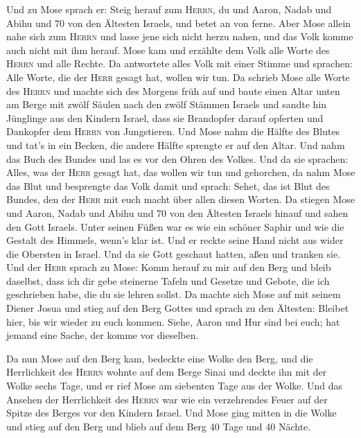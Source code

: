  Und zu Mose sprach er: Steig herauf zum \textsc{Herrn},
du und Aaron, Nadab und Abihu und 70 von den Ältesten Israels, und betet
an von ferne.  Aber Mose allein nahe sich zum
\textsc{Herrn} und lasse jene sich nicht herzu nahen, und das Volk komme
auch nicht mit ihm herauf.  Mose kam und erzählte dem Volk
alle Worte des \textsc{Herrn} und alle Rechte. Da antwortete alles Volk
mit einer Stimme und sprachen: Alle Worte, die der \textsc{Herr} gesagt
hat, wollen wir tun.  Da schrieb Mose alle Worte des
\textsc{Herrn} und machte sich des Morgens früh auf und baute einen
Altar unten am Berge mit zwölf Säulen nach den zwölf Stämmen Israels
 und sandte hin Jünglinge aus den Kindern Israel, dass sie
Brandopfer darauf opferten und Dankopfer dem \textsc{Herrn} von
Jungstieren.  Und Mose nahm die Hälfte des Blutes und
tat's in ein Becken, die andere Hälfte sprengte er auf den Altar.
 Und nahm das Buch des Bundes und las es vor den Ohren des
Volkes. Und da sie sprachen: Alles, was der \textsc{Herr} gesagt hat,
das wollen wir tun und gehorchen,  da nahm Mose das Blut
und besprengte das Volk damit und sprach: Sehet, das ist Blut des
Bundes, den der \textsc{Herr} mit euch macht über allen diesen Worten.
 Da stiegen Mose und Aaron, Nadab und Abihu und 70 von den
Ältesten Israels hinauf  und sahen den Gott Israels.
Unter seinen Füßen war es wie ein schöner Saphir und wie die Gestalt des
Himmels, wenn's klar ist.  Und er reckte seine Hand nicht
aus wider die Obersten in Israel. Und da sie Gott geschaut hatten, aßen
und tranken sie.  Und der \textsc{Herr} sprach zu Mose:
Komm herauf zu mir auf den Berg und bleib daselbst, dass ich dir gebe
steinerne Tafeln und Gesetze und Gebote, die ich geschrieben habe, die
du sie lehren sollst.  Da machte sich Mose auf mit seinem
Diener Josua und stieg auf den Berg Gottes  und sprach zu
den Ältesten: Bleibet hier, bis wir wieder zu euch kommen. Siehe, Aaron
und Hur sind bei euch; hat jemand eine Sache, der komme vor dieselben.

 Da nun Mose auf den Berg kam, bedeckte eine Wolke den
Berg,  und die Herrlichkeit des \textsc{Herrn} wohnte auf
dem Berge Sinai und deckte ihn mit der Wolke sechs Tage, und er rief
Mose am siebenten Tage aus der Wolke.  Und das Ansehen
der Herrlichkeit des \textsc{Herrn} war wie ein verzehrendes Feuer auf
der Spitze des Berges vor den Kindern Israel.  Und Mose
ging mitten in die Wolke und stieg auf den Berg und blieb auf dem Berg
40 Tage und 40 Nächte.

